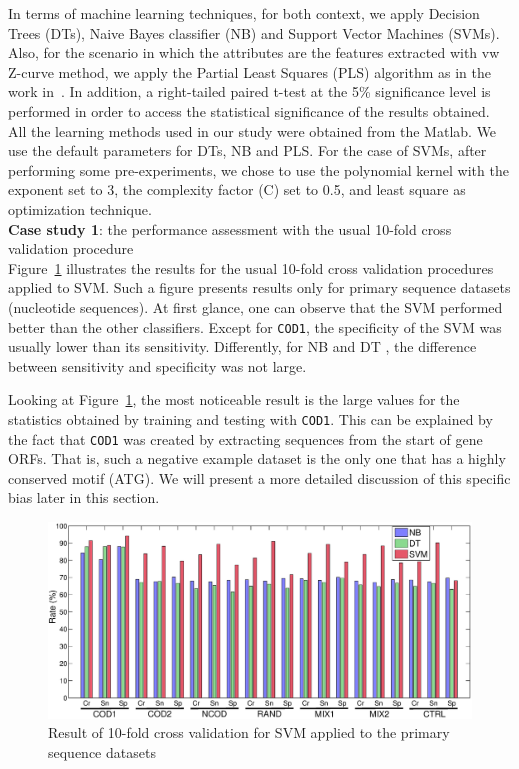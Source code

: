 \documentclass[runningheads,a4paper]{llncs}
\begin{document}
 In terms of machine learning techniques, for both context, we apply  Decision Trees (DTs),  Naive Bayes classifier (NB) and  Support Vector Machines (SVMs).  Also, for the scenario in which the attributes are the features extracted with  vw Z-curve  method, we apply the Partial Least Squares (PLS) algorithm as in the work in~\cite{song2011}. In addition, a right-tailed paired t-test at the 5\% significance level is performed in order to access the statistical significance of the results obtained. All the learning methods used in our study were obtained from the Matlab. We use the default parameters for DTs, NB and PLS. For the case of SVMs, after performing some  pre-experiments, we chose to use the polynomial kernel with the exponent set to 3, the complexity factor (C) set to 0.5, and least square as optimization technique. \\

\noindent
{\bf Case study 1}: the performance assessment with the usual 10-fold cross validation procedure \\

Figure~\ref{fig:seq} illustrates the results for the  usual  10-fold cross validation procedures applied to  SVM. Such a figure presents results  only for primary sequence datasets (nucleotide sequences). At first glance, one can observe that  the SVM  performed better than the other classifiers. Except for {\tt COD1}, the specificity of the SVM  was usually lower than its sensitivity. Differently, for  NB and DT , the difference between  sensitivity and specificity was not large. 

Looking at Figure~\ref{fig:seq},  the most noticeable result is the large values for the statistics obtained by training and testing with {\tt COD1}. This can be explained by the fact that {\tt COD1}  was created by extracting  sequences from  the start of gene ORFs. That is, such a negative example  dataset is the only one that has a highly conserved motif (ATG).  We will present a more detailed discussion of this specific bias later in this section. 

\begin{figure}

\vspace{0.0cm}
    \centering
    \includegraphics[width=1.0\textwidth]{Figs/Fig1.eps}
    \caption{Result of 10-fold cross validation for  SVM applied to the primary sequence datasets \label{fig:seq}}
   \vspace{0.0cm}
\end{figure}
\end{document}
